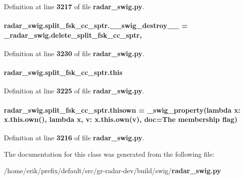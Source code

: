 Definition at line {\bf 3217} of file {\bf radar\+\_\+swig.\+py}.

\paragraph[{\+\_\+\+\_\+swig\+\_\+destroy\+\_\+\+\_\+}]{\setlength{\rightskip}{0pt plus 5cm}radar\+\_\+swig.\+split\+\_\+fsk\+\_\+cc\+\_\+sptr.\+\_\+\+\_\+swig\+\_\+destroy\+\_\+\+\_\+ = \+\_\+radar\+\_\+swig.\+delete\+\_\+split\+\_\+fsk\+\_\+cc\+\_\+sptr\hspace{0.3cm}{\ttfamily [static]}, {\ttfamily [private]}}\label{classradar__swig_1_1split__fsk__cc__sptr_ab3f78e1ea05bf9d60678ad0fab508e35}


Definition at line {\bf 3230} of file {\bf radar\+\_\+swig.\+py}.

\paragraph[{this}]{\setlength{\rightskip}{0pt plus 5cm}radar\+\_\+swig.\+split\+\_\+fsk\+\_\+cc\+\_\+sptr.\+this}\label{classradar__swig_1_1split__fsk__cc__sptr_a016765c83a2efeb616122671fa4daf7e}


Definition at line {\bf 3225} of file {\bf radar\+\_\+swig.\+py}.

\paragraph[{thisown}]{\setlength{\rightskip}{0pt plus 5cm}radar\+\_\+swig.\+split\+\_\+fsk\+\_\+cc\+\_\+sptr.\+thisown = {\bf \+\_\+swig\+\_\+property}(lambda x\+: x.\+this.\+own(), lambda {\bf x}, v\+: x.\+this.\+own(v), doc=\textquotesingle{}The membership flag\textquotesingle{})\hspace{0.3cm}{\ttfamily [static]}}\label{classradar__swig_1_1split__fsk__cc__sptr_a5abc6568c7c8fa23ef94f7d43705cae6}


Definition at line {\bf 3216} of file {\bf radar\+\_\+swig.\+py}.



The documentation for this class was generated from the following file\+:\begin{DoxyCompactItemize}
\item 
/home/erik/prefix/default/src/gr-\/radar-\/dev/build/swig/{\bf radar\+\_\+swig.\+py}\end{DoxyCompactItemize}
